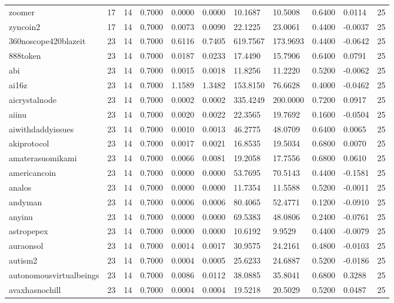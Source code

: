 \begin{table}[htbp]
\begin{tabular}{lllllllllll}
zoomer & 17 & 14 & 0.7000 & 0.0000 & 0.0000 & 10.1687 & 10.5008 & 0.6400 & 0.0114 & 25 \\
zyncoin2 & 17 & 14 & 0.7000 & 0.0073 & 0.0090 & 22.1225 & 23.0061 & 0.4400 & -0.0037 & 25 \\
360noscope420blazeit & 23 & 14 & 0.7000 & 0.6116 & 0.7405 & 619.7567 & 173.9693 & 0.4400 & -0.0642 & 25 \\
888token & 23 & 14 & 0.7000 & 0.0187 & 0.0233 & 17.4490 & 15.7906 & 0.6400 & 0.0791 & 25 \\
abi & 23 & 14 & 0.7000 & 0.0015 & 0.0018 & 11.8256 & 11.2220 & 0.5200 & -0.0062 & 25 \\
ai16z & 23 & 14 & 0.7000 & 1.1589 & 1.3482 & 153.8150 & 76.6628 & 0.4000 & -0.0462 & 25 \\
aicrystalnode & 23 & 14 & 0.7000 & 0.0002 & 0.0002 & 335.4249 & 200.0000 & 0.7200 & 0.0917 & 25 \\
aiinu & 23 & 14 & 0.7000 & 0.0020 & 0.0022 & 22.3565 & 19.7692 & 0.1600 & -0.0504 & 25 \\
aiwithdaddyissues & 23 & 14 & 0.7000 & 0.0010 & 0.0013 & 46.2775 & 48.0709 & 0.6400 & 0.0065 & 25 \\
akiprotocol & 23 & 14 & 0.7000 & 0.0017 & 0.0021 & 16.8535 & 19.5034 & 0.6800 & 0.0070 & 25 \\
amaterasuomikami & 23 & 14 & 0.7000 & 0.0066 & 0.0081 & 19.2058 & 17.7556 & 0.6800 & 0.0610 & 25 \\
americancoin & 23 & 14 & 0.7000 & 0.0000 & 0.0000 & 53.7695 & 70.5143 & 0.4400 & -0.1581 & 25 \\
analos & 23 & 14 & 0.7000 & 0.0000 & 0.0000 & 11.7354 & 11.5588 & 0.5200 & -0.0011 & 25 \\
andyman & 23 & 14 & 0.7000 & 0.0006 & 0.0006 & 80.4065 & 52.4771 & 0.1200 & -0.0910 & 25 \\
anyinu & 23 & 14 & 0.7000 & 0.0000 & 0.0000 & 69.5383 & 48.0806 & 0.2400 & -0.0761 & 25 \\
astropepex & 23 & 14 & 0.7000 & 0.0000 & 0.0000 & 10.6192 & 9.9529 & 0.4400 & -0.0079 & 25 \\
auraonsol & 23 & 14 & 0.7000 & 0.0014 & 0.0017 & 30.9575 & 24.2161 & 0.4800 & -0.0103 & 25 \\
autism2 & 23 & 14 & 0.7000 & 0.0004 & 0.0005 & 25.6233 & 24.6887 & 0.5200 & -0.0186 & 25 \\
autonomousvirtualbeings & 23 & 14 & 0.7000 & 0.0086 & 0.0112 & 38.0885 & 35.8041 & 0.6800 & 0.3288 & 25 \\
avaxhasnochill & 23 & 14 & 0.7000 & 0.0004 & 0.0004 & 19.5218 & 20.5029 & 0.5200 & 0.0487 & 25 \\

\end{tabular}
\end{table}
